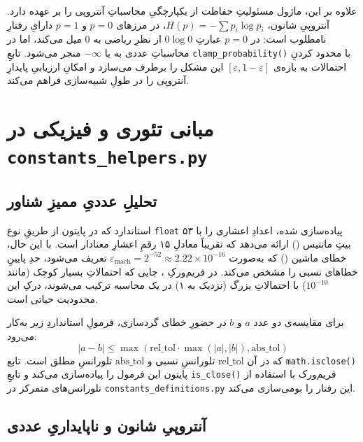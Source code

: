 علاوه بر این، ماژول مسئولیتِ حفاظت از یکپارچگیِ محاسباتِ آنتروپی را بر عهده دارد. آنتروپیِ شانون، $H(p) = -\sum p_i \log p_i$، در مرزهای $p = 0$ و $p = 1$ دارایِ رفتارِ نامطلوب است: در $p = 0$ عبارتِ $0 \log 0$ از نظرِ ریاضی به $0$ میل می‌کند، اما در محاسباتِ عددی به  یا $-\infty$ منجر می‌شود. تابعِ \texttt{clamp\_probability()} با محدود کردنِ احتمالات به بازه‌ی $[\varepsilon, 1 - \varepsilon]$ این مشکل را برطرف می‌سازد و امکانِ ارزیابیِ پایدارِ آنتروپی را در طولِ شبیه‌سازی فراهم می‌کند.

\section{مبانی تئوری و فیزیکی در \texttt{constants\_helpers.py}}

\subsection{تحلیلِ عددیِ ممیزِ شناور}

استاندارد  که در پایتون از طریقِ نوع \texttt{float} پیاده‌سازی شده، اعدادِ اعشاری را با ۵۳ بیتِ مانتیس () ارائه می‌دهد که تقریباً معادلِ ۱۵ رقمِ اعشارِ معنادار است. با این حال، خطای ماشین () که به‌صورت $\varepsilon_{\text{mach}} = 2^{-52} \approx 2.22 \times 10^{-16}$ تعریف می‌شود، حدِ پایینِ خطاهای نسبی را مشخص می‌کند. در فریم‌ورکِ ، جایی که احتمالاتِ بسیار کوچک (مانند $10^{-10}$) با احتمالاتِ بزرگ (نزدیک به ۱) در یک محاسبه ترکیب می‌شوند، درکِ این محدودیت حیاتی است.

برای مقایسه‌ی دو عدد $a$ و $b$ در حضورِ خطای گردسازی، فرمولِ استانداردِ زیر به‌کار می‌رود:
\begin{equation}
	|a - b| \leq \max(\text{rel\_tol} \cdot \max(|a|, |b|), \text{abs\_tol})
\end{equation}
که در آن $\text{rel\_tol}$ تلورانسِ نسبی و $\text{abs\_tol}$ تلورانسِ مطلق است. تابع \texttt{math.isclose()} پایتون این فرمول را پیاده‌سازی می‌کند و تابعِ \texttt{is\_close()} فریم‌ورک با استفاده از تلورانس‌های متمرکز در \texttt{constants\_definitions.py} این رفتار را بومی‌سازی می‌کند.

\subsection{آنتروپیِ شانون و ناپایداریِ عددی}

